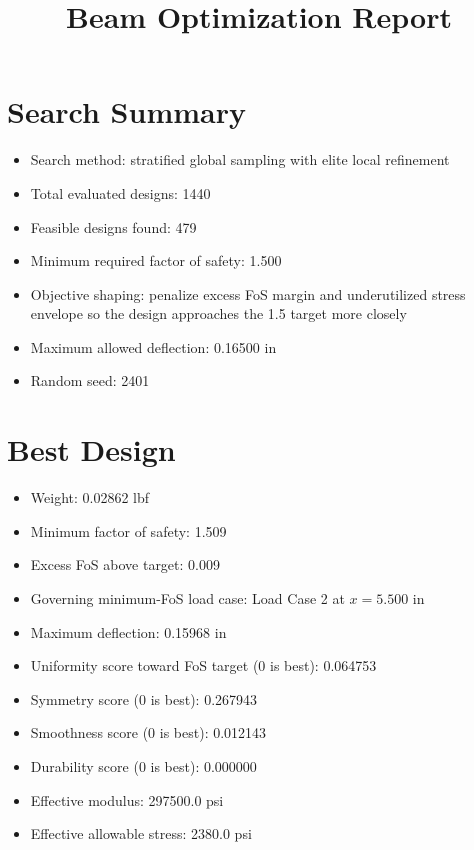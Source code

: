 \documentclass[11pt]{article}
\title{Beam Optimization Report}
\date{}
\begin{document}
\maketitle

\section*{Search Summary}
\begin{itemize}
\item Search method: stratified global sampling with elite local refinement
\item Total evaluated designs: 1440
\item Feasible designs found: 479
\item Minimum required factor of safety: 1.500
\item Objective shaping: penalize excess FoS margin and underutilized stress envelope so the design approaches the 1.5 target more closely
\item Maximum allowed deflection: 0.16500 in
\item Random seed: 2401
\end{itemize}

\section*{Best Design}
\begin{itemize}
\item Weight: 0.02862 lbf
\item Minimum factor of safety: 1.509
\item Excess FoS above target: 0.009
\item Governing minimum-FoS load case: Load Case 2 at $x=5.500$ in
\item Maximum deflection: 0.15968 in
\item Uniformity score toward FoS target (0 is best): 0.064753
\item Symmetry score (0 is best): 0.267943
\item Smoothness score (0 is best): 0.012143
\item Durability score (0 is best): 0.000000
\item Effective modulus: 297500.0 psi
\item Effective allowable stress: 2380.0 psi
\end{itemize}
\end{document}
